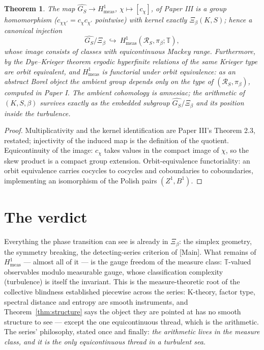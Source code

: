 \documentclass[11pt]{amsart}
\newtheorem{theorem}{Theorem}[section]
\theoremstyle{remark}
\newcommand{\T}{\mathbb{T}}
\newcommand{\R}{\mathcal{R}}
\newcommand{\Hmeas}{H^1_{\mathrm{meas}}}
\newcommand{\GS}{\widehat{G_S}}
\begin{document}
\begin{theorem}\label{thm:embed}
The map $\GS\to\Hmeas$, $\chi\mapsto[c_\chi]$, of Paper III is a group homomorphism
($c_{\chi\chi'}=c_\chi c_{\chi'}$ pointwise) with kernel exactly $\Xi_\beta(K,S)$; hence
a canonical injection
\[
\GS/\Xi_\beta\ \hookrightarrow\ \Hmeas(\R_S,\pi_\beta;\T),
\]
whose image consists of classes with equicontinuous Mackey range. Furthermore, by the
Dye--Krieger theorem \cite{Dye} ergodic hyperfinite relations of the same Krieger type
are orbit equivalent, and $\Hmeas$ is functorial under orbit equivalence: as an abstract
Borel object the ambient group depends only on the type of $(\R_S,\pi_\beta)$, computed
in Paper I. The ambient cohomology is amnesiac; the arithmetic of $(K,S,\beta)$ survives
exactly as the embedded subgroup $\GS/\Xi_\beta$ and its position inside the turbulence.
\end{theorem}

\begin{proof}
Multiplicativity and the kernel identification are Paper III's Theorem 2.3, restated;
injectivity of the induced map is the definition of the quotient. Equicontinuity of the
image: $c_\chi$ takes values in the compact image of $\chi$, so the skew product is a
compact group extension. Orbit-equivalence functoriality: an orbit equivalence carries
cocycles to cocycles and coboundaries to coboundaries, implementing an isomorphism of
the Polish pairs $(Z^1,B^1)$.
\end{proof}

\section{The verdict}\label{sec:verdict}

Everything the phase transition can see is already in $\Xi_\beta$: the simplex geometry,
the symmetry breaking, the detecting-series criterion of [Main]. What remains of
$\Hmeas$ --- almost all of it --- is the gauge freedom of the measure class:
$\T$-valued observables modulo measurable gauge, whose classification complexity
(turbulence) is itself the invariant. This is the measure-theoretic root of the
collective blindness established piecewise across the series: K-theory, factor type,
spectral distance and entropy are smooth instruments, and Theorem~\ref{thm:structure}
says the object they are pointed at has no smooth structure to see --- except the one
equicontinuous thread, which is the arithmetic. The series' philosophy, stated once and
finally: \emph{the arithmetic lives in the measure class, and it is the only
equicontinuous thread in a turbulent sea.}
\end{document}
